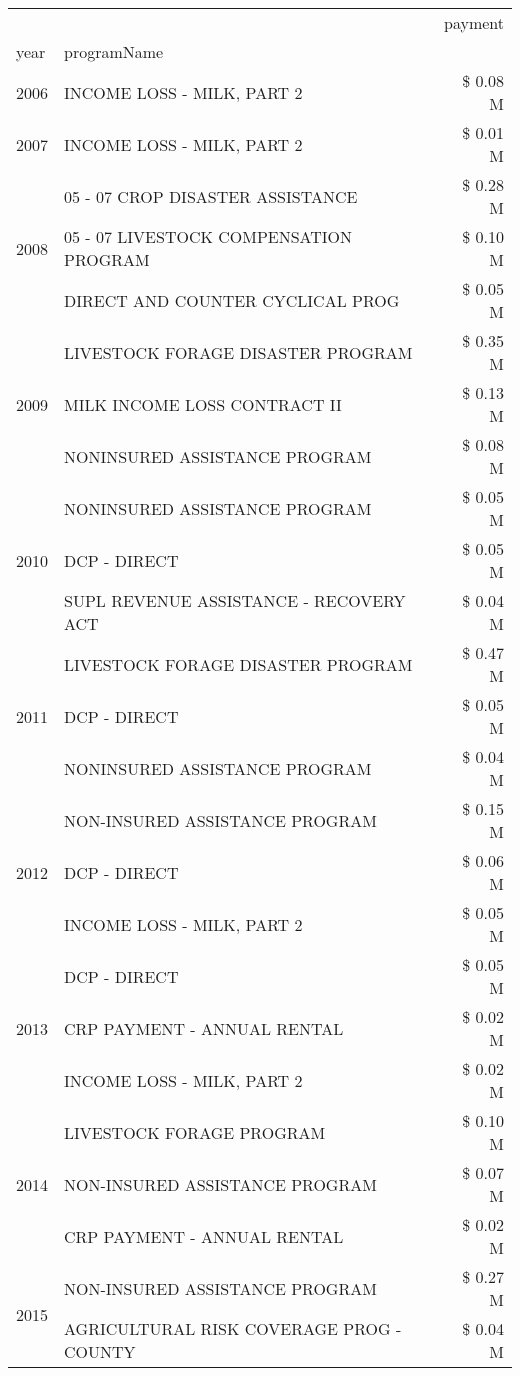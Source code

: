 \begin{tabular}{llr}
\toprule
 &  & payment \\
year & programName &  \\
\midrule
2006 & INCOME LOSS - MILK, PART 2 & \$ 0.08 M \\
\cline{1-3}
2007 & INCOME LOSS - MILK, PART 2 & \$ 0.01 M \\
\cline{1-3}
\multirow[t]{3}{*}{2008} & 05 - 07 CROP DISASTER ASSISTANCE & \$ 0.28 M \\
 & 05 - 07 LIVESTOCK COMPENSATION PROGRAM & \$ 0.10 M \\
 & DIRECT AND COUNTER CYCLICAL PROG & \$ 0.05 M \\
\cline{1-3}
\multirow[t]{3}{*}{2009} & LIVESTOCK FORAGE DISASTER  PROGRAM & \$ 0.35 M \\
 & MILK INCOME LOSS CONTRACT II & \$ 0.13 M \\
 & NONINSURED ASSISTANCE PROGRAM & \$ 0.08 M \\
\cline{1-3}
\multirow[t]{3}{*}{2010} & NONINSURED ASSISTANCE PROGRAM & \$ 0.05 M \\
 & DCP - DIRECT & \$ 0.05 M \\
 & SUPL REVENUE ASSISTANCE - RECOVERY ACT & \$ 0.04 M \\
\cline{1-3}
\multirow[t]{3}{*}{2011} & LIVESTOCK FORAGE DISASTER PROGRAM & \$ 0.47 M \\
 & DCP - DIRECT & \$ 0.05 M \\
 & NONINSURED ASSISTANCE PROGRAM & \$ 0.04 M \\
\cline{1-3}
\multirow[t]{3}{*}{2012} & NON-INSURED ASSISTANCE PROGRAM & \$ 0.15 M \\
 & DCP - DIRECT & \$ 0.06 M \\
 & INCOME LOSS - MILK, PART 2 & \$ 0.05 M \\
\cline{1-3}
\multirow[t]{3}{*}{2013} & DCP - DIRECT & \$ 0.05 M \\
 & CRP PAYMENT - ANNUAL RENTAL & \$ 0.02 M \\
 & INCOME LOSS - MILK, PART 2 & \$ 0.02 M \\
\cline{1-3}
\multirow[t]{3}{*}{2014} & LIVESTOCK FORAGE PROGRAM & \$ 0.10 M \\
 & NON-INSURED ASSISTANCE PROGRAM & \$ 0.07 M \\
 & CRP PAYMENT - ANNUAL RENTAL & \$ 0.02 M \\
\cline{1-3}
\multirow[t]{3}{*}{2015} & NON-INSURED ASSISTANCE PROGRAM & \$ 0.27 M \\
 & AGRICULTURAL RISK COVERAGE PROG - COUNTY & \$ 0.04 M \\

\end{tabular}
